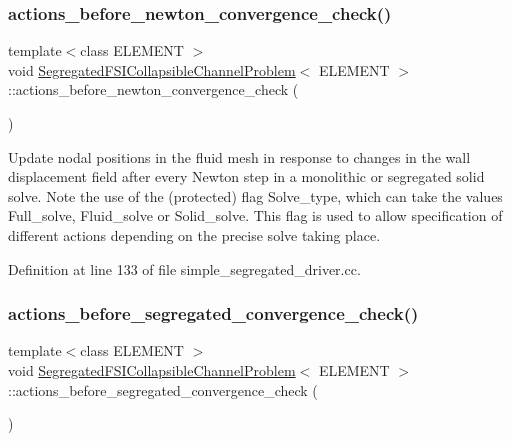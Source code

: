 \subsubsection{\texorpdfstring{actions\+\_\+before\+\_\+newton\+\_\+convergence\+\_\+check()}{actions\_before\_newton\_convergence\_check()}}
{\footnotesize\ttfamily template$<$class E\+L\+E\+M\+E\+NT $>$ \\
void \hyperlink{classSegregatedFSICollapsibleChannelProblem}{Segregated\+F\+S\+I\+Collapsible\+Channel\+Problem}$<$ E\+L\+E\+M\+E\+NT $>$\+::actions\+\_\+before\+\_\+newton\+\_\+convergence\+\_\+check (\begin{DoxyParamCaption}{ }\end{DoxyParamCaption})\hspace{0.3cm}{\ttfamily [inline]}}



Update nodal positions in the fluid mesh in response to changes in the wall displacement field after every Newton step in a monolithic or segregated solid solve. Note the use of the (protected) flag Solve\+\_\+type, which can take the values Full\+\_\+solve, Fluid\+\_\+solve or Solid\+\_\+solve. This flag is used to allow specification of different actions depending on the precise solve taking place. 



Definition at line 133 of file simple\+\_\+segregated\+\_\+driver.\+cc.

\mbox{\label{classSegregatedFSICollapsibleChannelProblem_a8ee14a1d4ab159c9b28dfcb177dc7c57}} 
\subsubsection{\texorpdfstring{actions\+\_\+before\+\_\+segregated\+\_\+convergence\+\_\+check()}{actions\_before\_segregated\_convergence\_check()}}
{\footnotesize\ttfamily template$<$class E\+L\+E\+M\+E\+NT $>$ \\
void \hyperlink{classSegregatedFSICollapsibleChannelProblem}{Segregated\+F\+S\+I\+Collapsible\+Channel\+Problem}$<$ E\+L\+E\+M\+E\+NT $>$\+::actions\+\_\+before\+\_\+segregated\+\_\+convergence\+\_\+check (\begin{DoxyParamCaption}{ }\end{DoxyParamCaption})\hspace{0.3cm}{\ttfamily [inline]}}

